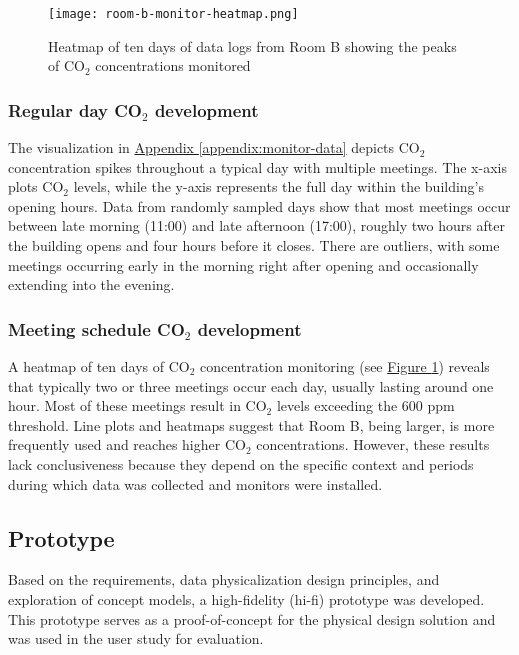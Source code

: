 \begin{figure}[h]
    \centering
    \texttt{[image: room-b-monitor-heatmap.png]}
    \caption{Heatmap of ten days of data logs from Room B showing the peaks of CO$_{2}$ concentrations monitored }
    \label{fig:room-b-heatmap-chart}
\end{figure}

\subsubsection{Regular day CO$_{2}$ development}

The visualization in \hyperref[appendix:monitor-data]{Appendix \ref*{appendix:monitor-data}} depicts CO$_{2}$ concentration spikes throughout a typical day with multiple meetings. The x-axis plots CO$_{2}$ levels, while the y-axis represents the full day within the building’s opening hours. Data from randomly sampled days show that most meetings occur between late morning (11:00) and late afternoon (17:00), roughly two hours after the building opens and four hours before it closes. There are outliers, with some meetings occurring early in the morning right after opening and occasionally extending into the evening.

\subsubsection{Meeting schedule CO$_{2}$ development}

A heatmap of ten days of CO$_{2}$ concentration monitoring (see \hyperref[fig:room-b-heatmap-chart]{Figure \ref*{fig:room-b-heatmap-chart}}) reveals that typically two or three meetings occur each day, usually lasting around one hour. Most of these meetings result in CO$_{2}$ levels exceeding the 600 ppm threshold. Line plots and heatmaps suggest that Room B, being larger, is more frequently used and reaches higher CO$_{2}$ concentrations. However, these results lack conclusiveness because they depend on the specific context and periods during which data was collected and monitors were installed.


\subsection{Prototype}
\label{sec:prototype_results}

Based on the requirements, data physicalization design principles, and exploration of concept models, a high-fidelity (hi-fi) prototype was developed. This prototype serves as a proof-of-concept for the physical design solution and was used in the user study for evaluation.

